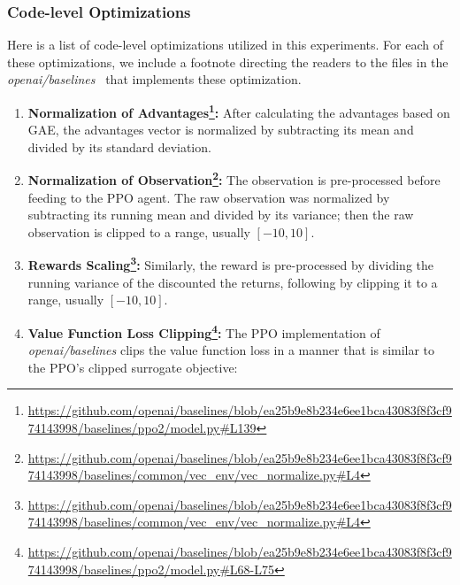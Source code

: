 \documentclass[letterpaper]{article}
\begin{document}
\subsubsection{Code-level Optimizations}
Here is a list of code-level optimizations utilized in this experiments. For each of these optimizations, we include a footnote directing the readers to the files in the  \emph{openai/baselines}~\cite{baselines} that implements these optimization.

\begin{enumerate}
    \item \textbf{Normalization of Advantages\footnote{\url{https://github.com/openai/baselines/blob/ea25b9e8b234e6ee1bca43083f8f3cf974143998/baselines/ppo2/model.py\#L139}}:} After calculating the advantages based on GAE, the advantages vector is normalized by subtracting its mean and divided by its standard deviation.
    \item \textbf{Normalization of Observation\footnote{\url{https://github.com/openai/baselines/blob/ea25b9e8b234e6ee1bca43083f8f3cf974143998/baselines/common/vec_env/vec_normalize.py\#L4}}:} The observation is pre-processed before feeding to the PPO agent. The raw observation was normalized by subtracting its running mean and divided by its variance; then the raw observation is clipped to a range, usually $[-10,10]$.
    \item \textbf{Rewards Scaling\footnote{\url{https://github.com/openai/baselines/blob/ea25b9e8b234e6ee1bca43083f8f3cf974143998/baselines/common/vec_env/vec_normalize.py\#L4}}:} Similarly, the reward is pre-processed by dividing the running variance of the discounted the returns, following by clipping it to a range, usually $[-10,10]$.
    \item \textbf{Value Function Loss Clipping\footnote{\url{https://github.com/openai/baselines/blob/ea25b9e8b234e6ee1bca43083f8f3cf974143998/baselines/ppo2/model.py\#L68-L75}}:} The PPO implementation of {\em  openai/baselines} clips the value function loss in a manner that is similar to the PPO's clipped surrogate objective:


\end{enumerate}
\end{document}
